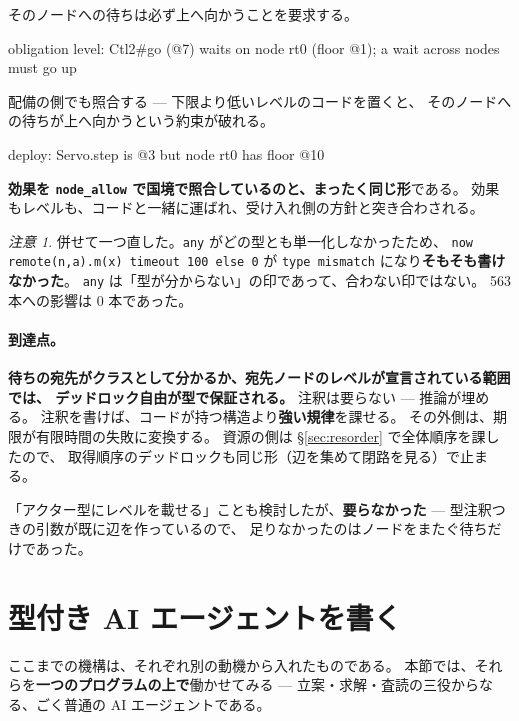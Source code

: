 \documentclass[11pt,a4paper]{ltjsarticle}
\theoremstyle{definition}
\theoremstyle{remark}
\newtheorem{remark}[theorem]{注意}
\begin{document}
そのノードへの待ちは必ず上へ向かうことを要求する。

\begin{term}
 obligation level: Ctl2#go (@7) waits on node rt0 (floor @1);
             a wait across nodes must go up
\end{term}

配備の側でも照合する --- 下限より低いレベルのコードを置くと、
そのノードへの待ちが上へ向かうという約束が破れる。

\begin{term}
deploy: Servo.step is @3 but node rt0 has floor @10
\end{term}

\textbf{効果を \texttt{node\_allow} で国境で照合しているのと、まったく同じ形}である。
効果もレベルも、コードと一緒に運ばれ、受け入れ側の方針と突き合わされる。

\begin{remark}
併せて一つ直した。\texttt{any} がどの型とも単一化しなかったため、
\texttt{now remote(n,a).m(x) timeout 100 else 0} が
\texttt{type mismatch} になり\textbf{そもそも書けなかった}。
\texttt{any} は「型が分からない」の印であって、合わない印ではない。
563 本への影響は 0 本であった。
\end{remark}

\paragraph{到達点。}
\textbf{待ちの宛先がクラスとして分かるか、宛先ノードのレベルが宣言されている範囲では、
デッドロック自由が型で保証される。}
注釈は要らない --- 推論が埋める。
注釈を書けば、コードが持つ構造より\textbf{強い規律}を課せる。
その外側は、期限が有限時間の失敗に変換する。
資源の側は \S\ref{sec:resorder} で全体順序を課したので、
取得順序のデッドロックも同じ形（辺を集めて閉路を見る）で止まる。

「アクター型にレベルを載せる」ことも検討したが、\textbf{要らなかった} ---
型注釈つきの引数が既に辺を作っているので、
足りなかったのはノードをまたぐ待ちだけであった。

\section{型付き AI エージェントを書く}
\label{sec:agent}

ここまでの機構は、それぞれ別の動機から入れたものである。
本節では、それらを\textbf{一つのプログラムの上で}働かせてみる ---
立案・求解・査読の三役からなる、ごく普通の AI エージェントである。
\end{document}
